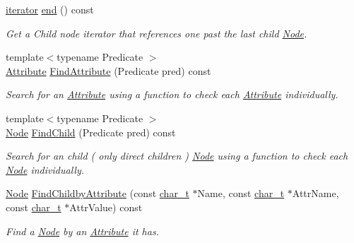 \begin{DoxyCompactItemize}
\hyperlink{classphys_1_1xml_1_1NodeIterator}{iterator} \hyperlink{classphys_1_1xml_1_1Node_a1f083209c52d7af4a354db2b3f198cf8}{end} () const 
\begin{DoxyCompactList}\small\item\em Get a Child node iterator that references one past the last child \hyperlink{classphys_1_1xml_1_1Node}{Node}. \item\end{DoxyCompactList}\item 
{\footnotesize template$<$typename Predicate $>$ }\\\hyperlink{classphys_1_1xml_1_1Attribute}{Attribute} \hyperlink{classphys_1_1xml_1_1Node_ab1ad6ee2e78ddd3f591faffe675ed910}{FindAttribute} (Predicate pred) const 
\begin{DoxyCompactList}\small\item\em Search for an \hyperlink{classphys_1_1xml_1_1Attribute}{Attribute} using a function to check each \hyperlink{classphys_1_1xml_1_1Attribute}{Attribute} individually. \item\end{DoxyCompactList}\item 
{\footnotesize template$<$typename Predicate $>$ }\\\hyperlink{classphys_1_1xml_1_1Node}{Node} \hyperlink{classphys_1_1xml_1_1Node_a1041d264f8927adb691c47ccacff28d4}{FindChild} (Predicate pred) const 
\begin{DoxyCompactList}\small\item\em Search for an child ( only direct children ) \hyperlink{classphys_1_1xml_1_1Node}{Node} using a function to check each \hyperlink{classphys_1_1xml_1_1Node}{Node} individually. \item\end{DoxyCompactList}\item 
\hyperlink{classphys_1_1xml_1_1Node}{Node} \hyperlink{classphys_1_1xml_1_1Node_a8a362455b50e54454f145f9109a85e49}{FindChildbyAttribute} (const \hyperlink{namespacephys_1_1xml_afc87705cd1c2917d87b879715a2d8f6e}{char\_\-t} $\ast$Name, const \hyperlink{namespacephys_1_1xml_afc87705cd1c2917d87b879715a2d8f6e}{char\_\-t} $\ast$AttrName, const \hyperlink{namespacephys_1_1xml_afc87705cd1c2917d87b879715a2d8f6e}{char\_\-t} $\ast$AttrValue) const 
\begin{DoxyCompactList}\small\item\em Find a \hyperlink{classphys_1_1xml_1_1Node}{Node} by an \hyperlink{classphys_1_1xml_1_1Attribute}{Attribute} it has. \item\end{DoxyCompactList}\item 

\end{DoxyCompactItemize}
